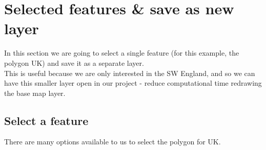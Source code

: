 \chapter{Selected features \& save as new layer}

\pagestyle{fancy}
\fancyhf{}
\fancyhead[OC]{\leftmark}
\fancyhead[EC]{\rightmark}
\cfoot{\thepage}

In this section we are going to select a single feature (for this example, the polygon UK) and save it as a separate layer.\\

This is useful because we are only interested in the SW England, and so we can have this smaller layer open in our project - reduce computational time redrawing the base map layer.\\ 

\section{Select a feature}
There are many options available to us to select the polygon for UK.

